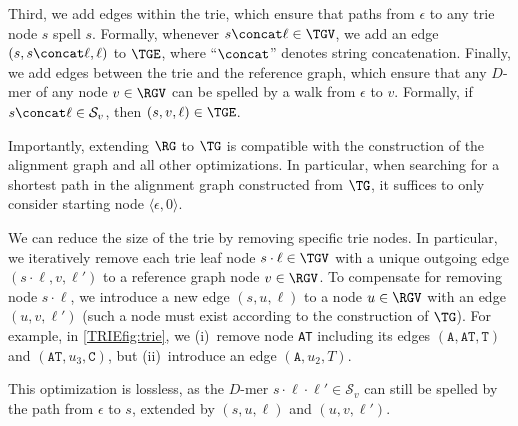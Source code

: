 Third, we add edges within the trie, which ensure that paths from $\epsilon$ to
any trie node $s$ spell $s$. Formally, whenever $s \concat \ell \in \TGV$, we add
an edge $(s,s \concat \ell, \ell)$ to $\TGE$, where ``$\concat$'' denotes string
concatenation.
%
Finally, we add edges between the trie and the reference graph, which ensure
that any $D$-mer of any node $v \in \RGV$ can be spelled by a walk from
$\epsilon$ to $v$. Formally, if $s \concat \ell \in \mathcal{S}_v$, then
$(s,v,\ell) \in \TGE$.

Importantly, extending $\RG$ to $\TG$ is compatible with the construction of the alignment graph and all other
optimizations. In particular, when searching for a shortest path in the
alignment graph constructed from $\TG$, it suffices to only consider starting
node $\langle \epsilon, 0 \rangle$.

 \label{TRIEpara:reducing_trie}
We can reduce the size of the trie by removing specific trie nodes.
%
In particular, we iteratively remove each trie leaf node $s \cdot \ell \in \TGV$ with a unique outgoing edge $(s \cdot \ell, v, \ell')$ to a reference graph node $v \in \RGV$.
%
To compensate for removing node $s \cdot \ell$, we introduce a new edge $(s, u, \ell)$ to a node $u \in \RGV$ with an edge $(u,v,\ell')$ (such a node must exist according to the construction of $\TG$).
%
For example, in \cref{TRIEfig:trie}, we (i)~remove node \texttt{AT} including its edges $(\texttt{A},\texttt{AT},\texttt{T})$ and $(\texttt{AT},u_3,\texttt{C})$, but (ii)~introduce an edge $(\texttt{A},u_2,T)$.

This optimization is lossless, as the $D$-mer $s \cdot \ell \cdot \ell' \in \mathcal{S}_v$ can still be spelled by the path from $\epsilon$ to $s$, extended by $(s, u, \ell)$ and $(u, v, \ell')$.